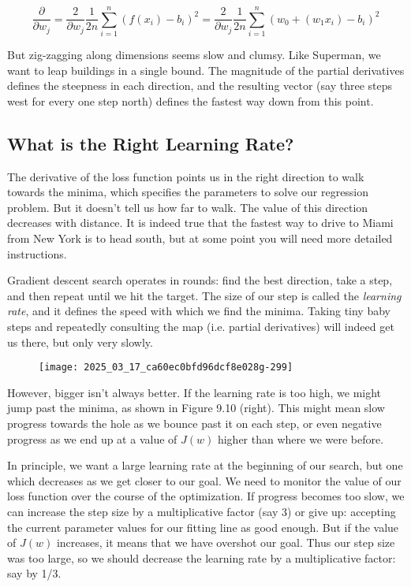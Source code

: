 \documentclass[10pt]{article}
\begin{document}
\[
\frac{\partial}{\partial w_{j}} = \frac{2}{\partial w_{j}} \frac{1}{2 n} \sum_{i=1}^{n} \left(f(x_{i}) - b_{i}\right)^{2}
= \frac{2}{\partial w_{j}} \frac{1}{2 n} \sum_{i=1}^{n} \left(w_{0} + (w_{1} x_{i}) - b_{i}\right)^{2}
\]

But zig-zagging along dimensions seems slow and clumsy. Like Superman, we want to leap buildings in a single bound. The magnitude of the partial derivatives defines the steepness in each direction, and the resulting vector (say three steps west for every one step north) defines the fastest way down from this point.

\subsection{What is the Right Learning Rate?}
The derivative of the loss function points us in the right direction to walk towards the minima, which specifies the parameters to solve our regression problem. But it doesn’t tell us how far to walk. The value of this direction decreases with distance. It is indeed true that the fastest way to drive to Miami from New York is to head south, but at some point you will need more detailed instructions.

Gradient descent search operates in rounds: find the best direction, take a step, and then repeat until we hit the target. The size of our step is called the \textit{learning rate}, and it defines the speed with which we find the minima. Taking tiny baby steps and repeatedly consulting the map (i.e. partial derivatives) will indeed get us there, but only very slowly.

\begin{figure}[h]
    \centering
    \texttt{[image: 2025\_03\_17\_ca60ec0bfd96dcf8e028g-299]}
\end{figure}

However, bigger isn’t always better. If the learning rate is too high, we might jump past the minima, as shown in Figure 9.10 (right). This might mean slow progress towards the hole as we bounce past it on each step, or even negative progress as we end up at a value of $J(w)$ higher than where we were before.

In principle, we want a large learning rate at the beginning of our search, but one which decreases as we get closer to our goal. We need to monitor the value of our loss function over the course of the optimization. If progress becomes too slow, we can increase the step size by a multiplicative factor (say 3) or give up: accepting the current parameter values for our fitting line as good enough. But if the value of $J(w)$ increases, it means that we have overshot our goal. Thus our step size was too large, so we should decrease the learning rate by a multiplicative factor: say by 1/3.
\end{document}
